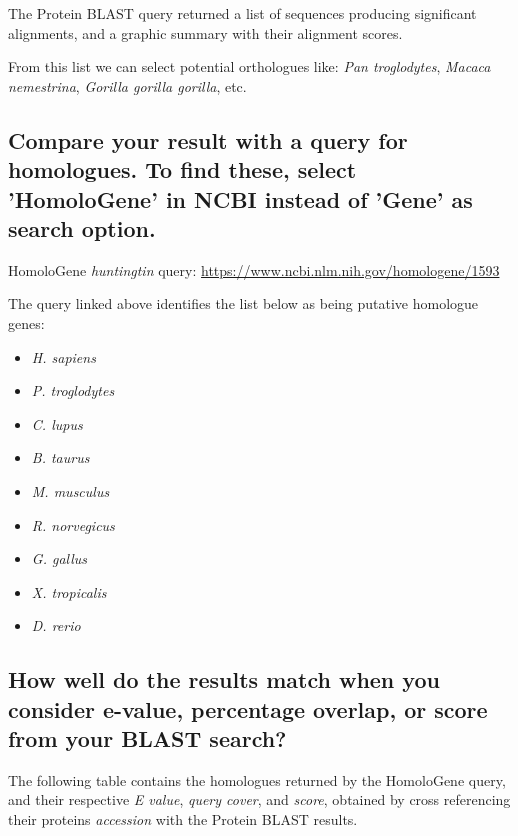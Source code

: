 The Protein BLAST query returned a list of sequences producing significant alignments, and a graphic summary with their alignment scores.

From this list we can select potential orthologues like: \textit{Pan troglodytes}, \textit{Macaca nemestrina}, \textit{Gorilla gorilla gorilla}, etc.


\subsection{Compare your result with a query for homologues. To find these, select 'HomoloGene' in NCBI instead of 'Gene' as search option.}

HomoloGene \textit{huntingtin} query: \url{https://www.ncbi.nlm.nih.gov/homologene/1593}

The query linked above identifies the list below as being putative homologue genes:

\begin{multicols}{3}
    \begin{itemize}
        \item \textit{H. sapiens}
        \item \textit{P. troglodytes}
        \item \textit{C. lupus}
        \item \textit{B. taurus}
        \item \textit{M. musculus}
        \item \textit{R. norvegicus}
        \item \textit{G. gallus}
        \item \textit{X. tropicalis}
        \item \textit{D. rerio}
    \end{itemize}
\end{multicols}


\subsection{How well do the results match when you consider e-value, percentage overlap, or score from your BLAST search?}

The following table contains the homologues returned by the HomoloGene query, and their respective \textit{E value}, \textit{query cover}, and \textit{score}, obtained by cross referencing their proteins \textit{accession} with the Protein BLAST results.

